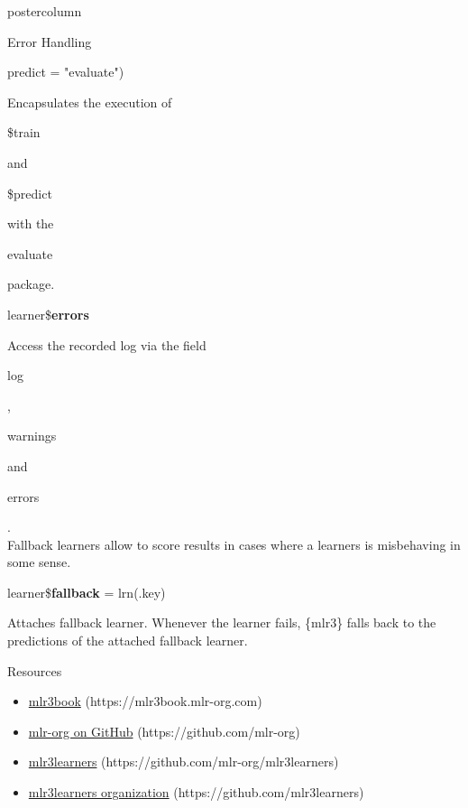 \documentclass{beamer}
\newcommand{\codeinline}[1]{\begin{codeboxinline}#1\end{codeboxinline}}
\begin{document}
\begin{withoutheader}
\begin{frame}[fragile]{}
\begin{columns}
\begin{column}{.245\textwidth}
\begin{beamercolorbox}[center]{postercolumn}
\begin{minipage}{.98\textwidth}
{\begin{myblock}{Error Handling}
\begin{codeboxmultiline}[width=16cm]
								\hspace*{1ex} predict = "evaluate")
							\end{codeboxmultiline}
							Encapsulates the execution of \codeinline{\$train} and \codeinline{\$predict} with the \codeinline{evaluate} package.
							\\
							\begin{codebox}
								learner\$\textbf{errors}
							\end{codebox}
							Access the recorded log via the field \codeinline{log}, \codeinline{warnings} and \codeinline{errors}. 
							\vspace{1em}
							\\
							Fallback learners allow to score results in cases where a learners is misbehaving in some sense.
							\\
							\begin{codeboxmultiline}[width=25cm]
								\footnotesize{
									learner\$\textbf{fallback} = lrn(.key)
								}
							\end{codeboxmultiline}
							Attaches fallback learner. Whenever the learner fails, \{mlr3\} falls back to the predictions of the attached fallback learner.
						\end{myblock}
						\begin{myblock}{Resources}
							\begin{itemize}
								\item \href{https://mlr3book.mlr-org.com/index.html}{mlr3book} (https://mlr3book.mlr-org.com)
								\item \href{https://github.com/mlr-org}{mlr-org on GitHub} (https://github.com/mlr-org)
								\item \href{https://github.com/mlr-org/mlr3learners}{mlr3learners} (https://github.com/mlr-org/mlr3learners)
								\item \href{https://github.com/mlr3learners}{mlr3learners organization} (https://github.com/mlr3learners)
								\vspace{1em}
							\end{itemize}
						\end{myblock}
						\vfill
					}
				\end{minipage}
			\end{beamercolorbox}
		\end{column}
	\end{columns}
\end{frame}
\end{withoutheader}
\end{document}
